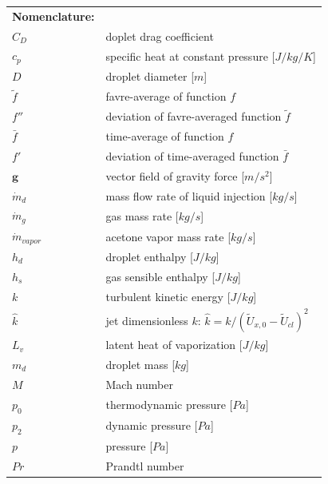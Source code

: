 \documentclass[preprint,12pt,review]{elsarticle}
\newcommand{\bv}[1]{\mathbf{#1}}
\begin{document}
\begin{tabular}{ll}
\textbf{Nomenclature:} & \\
$C_D$ & doplet drag coefficient \\
$c_p$ & specific heat at constant pressure [$J/kg/K$] \\
$D$ & droplet diameter [$m$]\\
$\tilde{f}$ & favre-average of function $f$\\
$f''$ & deviation of favre-averaged function $\tilde{f}$\\
$\bar{f}$ & time-average of function $f$\\
$f'$ & deviation of time-averaged function $\bar{f}$\\
$\bv{g}$ & vector field of gravity force [$m/s^2$]\\
$\dot{m}_d$ & mass flow rate of liquid injection [$kg/s$]\\
$\dot{m}_{g}$ & gas mass rate [$kg/s$]\\
$\dot{m}_{vapor}$ & acetone vapor mass rate [$kg/s$]\\
$h_d$ & droplet enthalpy [$J/kg$]\\
$h_s$ & gas sensible enthalpy [$J/kg$]\\
$k$ & turbulent kinetic energy [$J/kg$]\\
$\hat{k}$ & jet dimensionless $k$: $\hat{k}=k/(\tilde{U}_{x,0}-\tilde{U}_{cl})^2$ \\
$L_v$ & latent heat of vaporization [$J/kg$]\\
$m_d$ & droplet mass [$kg$]\\
$M$ & Mach number \\
$p_{0}$ & thermodynamic pressure [$Pa$]\\
$p_{2}$ & dynamic pressure [$Pa$]\\
$p$ & pressure [$Pa$]\\
$Pr$ & Prandtl number \\
\end{tabular}

\vspace{25pt}
\end{document}
